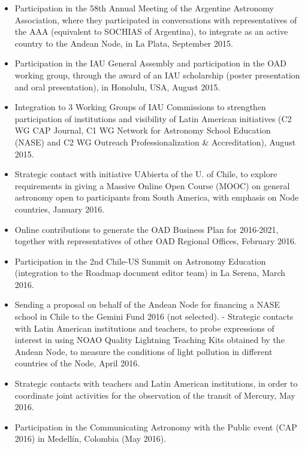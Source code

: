 \begin{itemize}
    \item Participation in the 58th Annual Meeting of the Argentine Astronomy Association, where they participated in conversations with representatives of the AAA (equivalent to SOCHIAS of Argentina), to integrate as an active country to the Andean Node, in La Plata, September 2015.

    \item Participation in the IAU General Assembly and participation in the OAD working group, through the award of an IAU scholarship (poster presentation and oral presentation), in Honolulu, USA, August 2015.

    \item Integration to 3 Working Groups of IAU Commissions to strengthen participation of institutions and visibility of Latin American initiatives (C2 WG CAP Journal, C1 WG Network for Astronomy School Education (NASE) and C2 WG Outreach Professionalization \& Accreditation), August 2015.

    \item Strategic contact with initiative UAbierta of the U. of Chile, to explore requirements in giving a Massive Online Open Course (MOOC) on general astronomy open to participants from South America, with emphasis on Node countries, January 2016.

    \item Online contributions to generate the OAD Business Plan for 2016-2021, together with representatives of other OAD Regional Offices, February 2016.

    \item Participation in the 2nd Chile-US Summit on Astronomy Education (integration to the Roadmap document editor team) in La Serena, March 2016.

    \item Sending a proposal on behalf of the Andean Node for financing a NASE school in Chile to the Gemini Fund 2016 (not selected). - Strategic contacts with Latin American institutions and teachers, to probe expressions of interest in using NOAO Quality Lightning Teaching Kits obtained by the Andean Node, to measure the conditions of light pollution in different countries of the Node, April 2016.

    \item Strategic contacts with teachers and Latin American institutions, in order to coordinate joint activities for the observation of the transit of Mercury, May 2016.

    \item Participation in the Communicating Astronomy with the Public event (CAP 2016) in Medellín, Colombia (May 2016).


\end{itemize}
